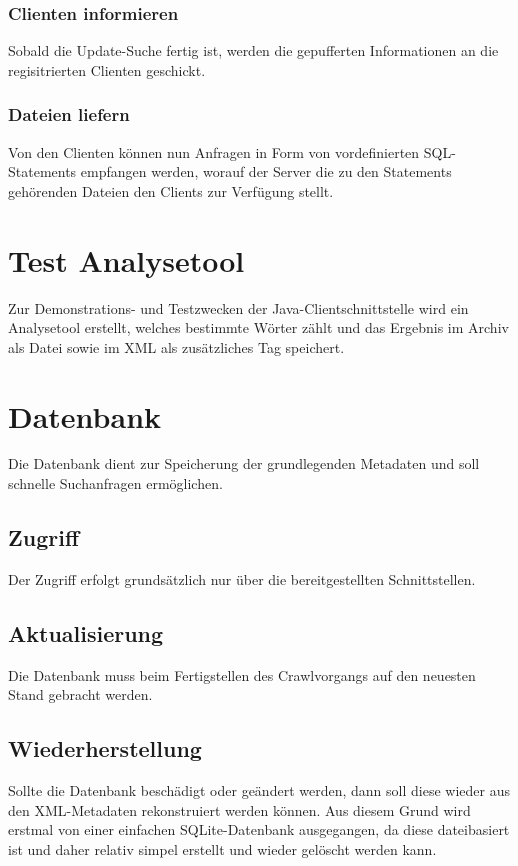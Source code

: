 	\subsubsection{Clienten informieren} \label{spec:req:jcs:server:clientnotify}
		Sobald die Update-Suche fertig ist, werden die gepufferten Informationen an die regisitrierten Clienten geschickt.
	\subsubsection{Dateien liefern} \label{spec:req:jcs:server:data}
		Von den Clienten können nun Anfragen in Form von vordefinierten SQL-Statements empfangen werden, worauf der Server die zu den Statements gehörenden Dateien den Clients zur Verfügung stellt.
\section{Test Analysetool}
	Zur Demonstrations- und Testzwecken der Java-Clientschnittstelle wird ein Analysetool erstellt, welches bestimmte Wörter zählt
	und das Ergebnis im Archiv als Datei sowie im XML als zusätzliches Tag speichert.

\section{Datenbank} \label{spec:req:db}
	Die Datenbank dient zur Speicherung der grundlegenden Metadaten und soll schnelle Suchanfragen ermöglichen.
\subsection{Zugriff}
	Der Zugriff erfolgt grundsätzlich nur über die bereitgestellten Schnittstellen.
\subsection{Aktualisierung} \label{spec:req:db:update}
	Die Datenbank muss beim Fertigstellen des Crawlvorgangs auf den neuesten Stand gebracht werden.
\subsection{Wiederherstellung} \label{spec:req:db:recovery}
	Sollte die Datenbank beschädigt oder geändert werden, dann soll diese wieder aus den
	XML-Metadaten rekonstruiert werden können.
	Aus diesem Grund wird erstmal von einer einfachen SQLite-Datenbank ausgegangen, 
	da diese dateibasiert ist und daher relativ simpel erstellt und wieder gelöscht werden kann.

